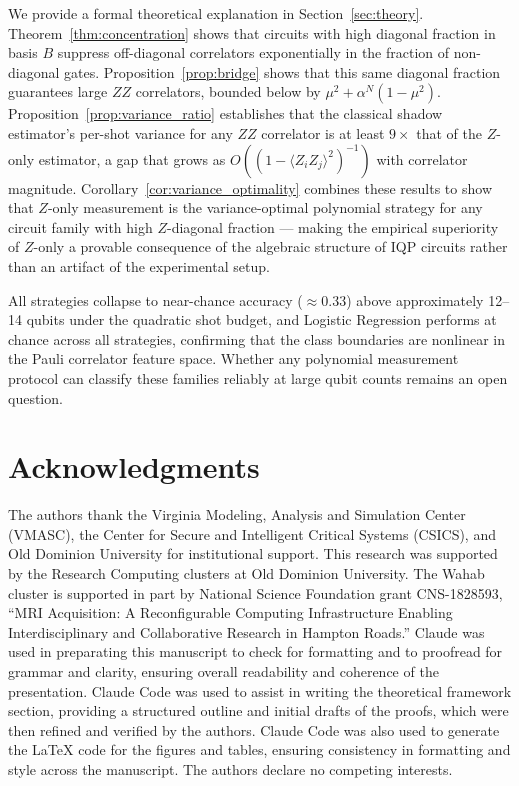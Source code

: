\documentclass[conference]{IEEEtran}
\begin{document}
We provide a formal theoretical explanation in Section~\ref{sec:theory}. Theorem~\ref{thm:concentration} shows that circuits with high diagonal fraction in basis $B$ suppress off-diagonal correlators exponentially in the fraction of non-diagonal gates. Proposition~\ref{prop:bridge} shows that this same diagonal fraction guarantees large $ZZ$ correlators, bounded below by $\mu^2 + \alpha^N(1-\mu^2)$. Proposition~\ref{prop:variance_ratio} establishes that the classical shadow estimator's per-shot variance for any $ZZ$ correlator is at least $9\times$ that of the $Z$-only estimator, a gap that grows as $O((1-\langle Z_iZ_j\rangle^2)^{-1})$ with correlator magnitude. Corollary~\ref{cor:variance_optimality} combines these results to show that $Z$-only measurement is the variance-optimal polynomial strategy for any circuit family with high $Z$-diagonal fraction --- making the empirical superiority of $Z$-only a provable consequence of the algebraic structure of IQP circuits rather than an artifact of the experimental setup.

All strategies collapse to near-chance accuracy ($\approx 0.33$) above approximately 12--14 qubits under the quadratic shot budget, and Logistic Regression performs at chance across all strategies, confirming that the class boundaries are nonlinear in the Pauli correlator feature space. Whether any polynomial measurement protocol can classify these families reliably at large qubit counts remains an open question.

\section*{Acknowledgments}
The authors thank the Virginia Modeling, Analysis and Simulation Center (VMASC), the 
Center for Secure and Intelligent Critical Systems (CSICS), and Old Dominion University for institutional support. 
This research was supported by the Research Computing clusters at Old Dominion University.
The Wahab cluster is supported in part by National Science Foundation grant CNS-1828593, ``MRI Acquisition: A Reconfigurable Computing Infrastructure Enabling Interdisciplinary and Collaborative Research in Hampton Roads.''
Claude was used in preparating this manuscript to check for formatting and to proofread for grammar and clarity, ensuring overall readability and coherence of the presentation.
Claude Code was used to assist in writing the theoretical framework section, providing a structured outline and initial drafts of the proofs, which were then refined and verified by the authors.
Claude Code was also used to generate the LaTeX code for the figures and tables, ensuring consistency in formatting and style across the manuscript.
The authors declare no competing interests.


\end{document}
